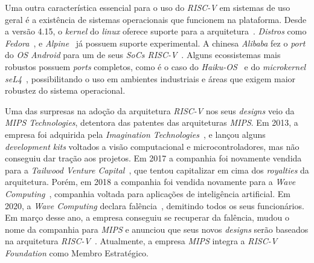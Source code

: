 { Uma outra característica essencial para o uso do \textit{RISC-V} em sistemas
    de uso geral é a existência de sistemas operacionais que funcionem na
    plataforma. Desde a versão 4.15, o \textit{kernel} do \textit{linux}
    oferece suporte para a arquitetura~\cite{linux_kernel}. \textit{Distros}
    como \textit{Fedora}~\cite{fedora_experimental},
    e \textit{Alpine}~\cite{alpine_experimental} já possuem suporte experimental.
    A chinesa \textit{Alibaba} fez o \textit{port} do \textit{OS Android}
    para um de seus \textit{SoCs RISC-V}~\cite{alibaba_android}. Alguns
    ecossistemas mais robustos possuem \textit{ports} completos, como é o
    caso do \textit{Haiku-OS}~\cite{haiku_riscv} e do \textit{microkernel
    seL4}~\cite{sel4_riscv}, possibilitando o uso em ambientes industriais
    e áreas que exigem maior robustez do sistema operacional.
}

{ Uma das surpresas na adoção da arquitetura \textit{RISC-V} nos seus
    \textit{designs} veio da \textit{MIPS Technologies}, detentora das
    patentes das arquiteturas \textit{MIPS}. Em 2013, a empresa foi adquirida
    pela \textit{Imagination Technologies}~\cite{imagination_technologies_acq},
    e lançou alguns \textit{development kits} voltados a visão computacional
    e microcontroladores, mas não conseguiu dar tração aos projetos.
    Em 2017 a companhia foi novamente vendida para a \textit{Tailwood
    Venture Capital}~\cite{tailwood_acq}, que tentou capitalizar em cima dos
    \textit{royalties} da arquitetura. Porém, em 2018 a companhia foi vendida
    novamente para a \textit{Wave Computing}~\cite{wave_comp_acq}, companhia
    voltada para aplicações de inteligência artificial. Em 2020, a
    \textit{Wave Computing} declara falência~\cite{wave_comp_bankrupt},
    demitindo todos os seus funcionários. Em março desse ano, a empresa
    conseguiu se recuperar da falência, mudou o nome da companhia para
    \textit{MIPS} e anunciou que seus novos \textit{designs} serão baseados
    na arquitetura \textit{RISC-V}~\cite{mips_reborn}. Atualmente, a empresa
    \textit{MIPS} integra a \textit{RISC-V Foundation} como Membro Estratégico.
}


